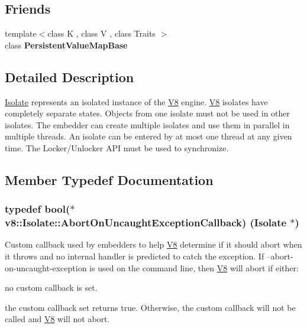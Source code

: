 \subsection*{Friends}
\begin{DoxyCompactItemize}
\item 
{\footnotesize template$<$class K , class V , class Traits $>$ }\\class {\bfseries Persistent\+Value\+Map\+Base}\hypertarget{classv8_1_1_isolate_a08e2b8f164392d71811ce6cc134f33e3}{}\label{classv8_1_1_isolate_a08e2b8f164392d71811ce6cc134f33e3}

\end{DoxyCompactItemize}


\subsection{Detailed Description}
\hyperlink{classv8_1_1_isolate}{Isolate} represents an isolated instance of the \hyperlink{classv8_1_1_v8}{V8} engine. \hyperlink{classv8_1_1_v8}{V8} isolates have completely separate states. Objects from one isolate must not be used in other isolates. The embedder can create multiple isolates and use them in parallel in multiple threads. An isolate can be entered by at most one thread at any given time. The Locker/\+Unlocker A\+PI must be used to synchronize. 

\subsection{Member Typedef Documentation}
\subsubsection[{\texorpdfstring{Abort\+On\+Uncaught\+Exception\+Callback}{AbortOnUncaughtExceptionCallback}}]{\setlength{\rightskip}{0pt plus 5cm}typedef bool($\ast$ v8\+::\+Isolate\+::\+Abort\+On\+Uncaught\+Exception\+Callback) ({\bf Isolate} $\ast$)}\hypertarget{classv8_1_1_isolate_aeb1d49e500d9521b42743a6a740271e2}{}\label{classv8_1_1_isolate_aeb1d49e500d9521b42743a6a740271e2}
Custom callback used by embedders to help \hyperlink{classv8_1_1_v8}{V8} determine if it should abort when it throws and no internal handler is predicted to catch the exception. If --abort-\/on-\/uncaught-\/exception is used on the command line, then \hyperlink{classv8_1_1_v8}{V8} will abort if either\+:
\begin{DoxyItemize}
\item no custom callback is set.
\item the custom callback set returns true. Otherwise, the custom callback will not be called and \hyperlink{classv8_1_1_v8}{V8} will not abort. 
\end{DoxyItemize}

